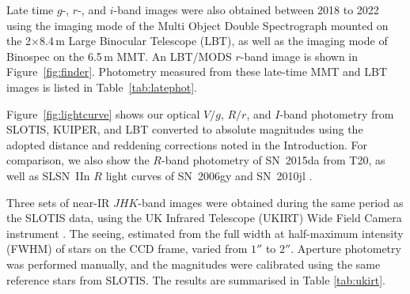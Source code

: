 \documentclass[fleqn,usenatbib,useAMS]{mnras}
\begin{document}



Late time $g$-, $r$-, and $i$-band images were also obtained between 2018 to 2022 using the imaging mode of the Multi Object Double Spectrograph \citep[MODS]{Bya00} mounted  on the 2$\times$8.4\,m Large Binocular Telescope (LBT), as well as the imaging mode of Binospec  \citep{fabricant19} on the 6.5\,m MMT.  An LBT/MODS $r$-band image is shown in Figure~\ref{fig:finder}.   
Photometry measured from these late-time MMT and LBT images is listed in Table~\ref{tab:latephot}.

Figure~\ref{fig:lightcurve} shows our optical $V/g$, $R/r$, and $I$-band photometry from SLOTIS, KUIPER, and LBT converted to absolute magnitudes using the adopted distance and reddening corrections noted in the Introduction.  For comparison, we also show the $R$-band photometry of SN~2015da from T20, as well as SLSN~IIn $R$ light curves of SN~2006gy \citep{smith07} and SN~2010jl \citep{fransson14}.

Three sets of near-IR $JHK$-band images were obtained during the same period as the SLOTIS data, using the UK Infrared Telescope (UKIRT) Wide Field Camera instrument \citep[WFCAM;][]{Hod09}. The seeing, estimated from the full width at half-maximum intensity (FWHM) of stars on the CCD frame, varied from $1''$ to $2''$. Aperture photometry was performed manually, and the magnitudes were calibrated using the same reference stars from SLOTIS. The results are summarised in Table \ref{tab:ukirt}.
\end{document}
